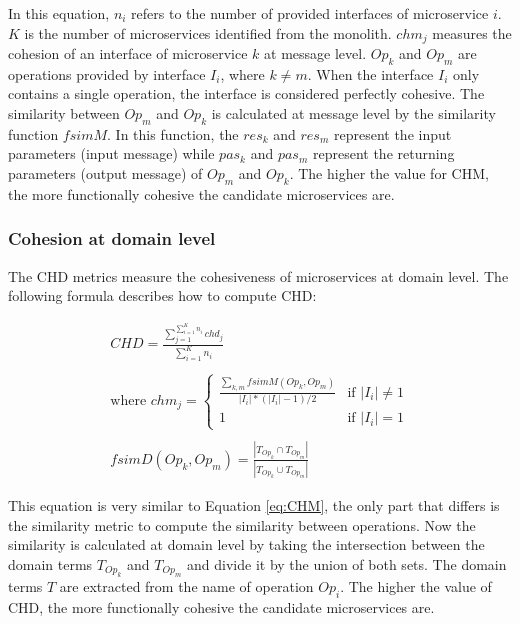 In this equation, $n_i$ refers to the number of provided interfaces of microservice $i$. $K$ is the number of microservices identified from the monolith. $chm_j$ measures the cohesion of an interface of microservice $k$ at message level. $Op_k$ and $Op_m$ are operations provided by interface $I_i$, where $k \neq m$. When the interface $I_i$ only contains a single operation, the interface is considered perfectly cohesive. The similarity between $Op_m$ and $Op_k$ is calculated at message level by the similarity function $fsimM$. In this function, the $res_k$ and $res_m$ represent the input parameters (input message) while $pas_k$ and $pas_m$ represent the returning parameters (output message) of $Op_m$ and $Op_k$. The higher the value for CHM, the more functionally cohesive the candidate microservices are. 

\subsubsection{Cohesion at domain level}\label{sss:step4_chd}
The CHD metrics measure the cohesiveness of microservices at domain level. The following formula describes how to compute CHD:

\begin{equation}\label{eq:CHD}
    \begin{split}
        CHD = \frac{\sum_{j=1}^{\sum_{i=1}^{K} n_i} chd_j}{\sum_{i=1}^{K} n_i}\\\\
        \text{where  } chm_j = 
        \begin{cases}
            \frac{\sum_{k,m} fsimM(Op_k, Op_m)}{|I_i|*(|I_i|-1)/2} & \text{if } |I_i| \neq 1 \\
            1 & \text{if } |I_i| = 1
        \end{cases} \\\\
        fsimD(Op_k, Op_m) = \frac{|T_{Op_k} \cap T_{Op_m}|}{|T_{Op_k} \cup T_{Op_m}|}
    \end{split}
\end{equation}

This equation is very similar to Equation \ref{eq:CHM}, the only part that differs is the similarity metric to compute the similarity between operations. Now the similarity is calculated at domain level by taking the intersection between the domain terms $T_{Op_k}$ and $T_{Op_m}$ and divide it by the union of both sets. The domain terms $T$ are extracted from the name of operation $Op_i$. The higher the value of CHD, the more functionally cohesive the candidate microservices are.

